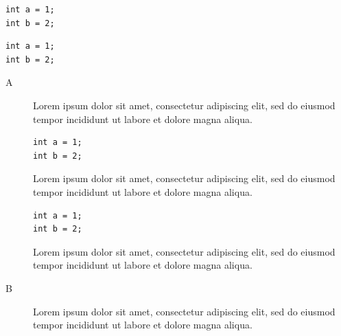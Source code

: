 \documentclass{article}
\begin{document}
\begin{lstlisting}[caption={Hello World!}]
int a = 1;
int b = 2;
\end{lstlisting}

\begin{lstlisting}[caption={Hello World!},captionpos=b]
int a = 1;
int b = 2;
\end{lstlisting}

\begin{description}
\item[A]
Lorem ipsum dolor sit amet, consectetur adipiscing elit, sed do eiusmod tempor incididunt ut labore et dolore magna aliqua.
\begin{lstlisting}[caption={Hello World!}]
int a = 1;
int b = 2;
\end{lstlisting}
Lorem ipsum dolor sit amet, consectetur adipiscing elit, sed do eiusmod tempor incididunt ut labore et dolore magna aliqua.
\begin{lstlisting}[caption={Hello World!},captionpos=b]
int a = 1;
int b = 2;
\end{lstlisting}
Lorem ipsum dolor sit amet, consectetur adipiscing elit, sed do eiusmod tempor incididunt ut labore et dolore magna aliqua.
\item[B]
Lorem ipsum dolor sit amet, consectetur adipiscing elit, sed do eiusmod tempor incididunt ut labore et dolore magna aliqua.
\end{description}
\end{document}
